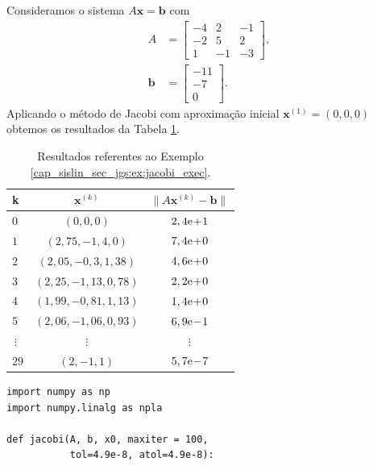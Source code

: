 \begin{ex}\label{cap_sislin_sec_jgs:ex:jacobi_exec}
  Consideramos o sistema $A\pmb{x} = \pmb{b}$ com
  \begin{equation}
    \begin{aligned}
    A &=
    \begin{bmatrix}
      -4 & 2 & -1 \\
      -2 & 5 & 2 \\
       1 & -1 & -3
    \end{bmatrix},\\
    \pmb{b} &=
    \begin{bmatrix}
      -11\\ -7\\ 0
    \end{bmatrix}.
  \end{aligned}
  \end{equation}
  Aplicando o método de Jacobi com aproximação inicial $\pmb{x}^{(1)} = (0, 0, 0)$ obtemos os resultados da Tabela \ref{cap_sislin_sec_jgs:tab:ex_jacobi_exec}.

  \begin{table}[h!]
    \centering
    \begin{tabular}{l|cc}
      k & $\pmb{x}^{(k)}$ & $\|A\pmb{x}^{(k)}-\pmb{b}\|$\\\hline
      $0$ & $(0, 0, 0)$ & $2,4\mathrm{e}\!+\!1$ \\
      $1$ & $(2,75, -1,4, 0)$ & $7,4\mathrm{e}\!+\!0$ \\
      $2$ & $(2,05, -0,3,  1,38)$ & $4,6\mathrm{e}\!+\!0$ \\
      $3$ & $(2,25, -1,13, 0,78)$ & $2,2\mathrm{e}\!+\!0$ \\
      $4$ & $(1,99, -0,81, 1,13)$ & $1,4\mathrm{e}\!+\!0$ \\
      $5$ & $(2,06, -1,06,  0,93)$ & $6,9\mathrm{e}\!-\!1$ \\
      $~\vdots$ & $\vdots$ & $\vdots$\\
      $29$ & $(2, -1,  1)$ & $5,7\mathrm{e}\!-\!7$\\\hline
    \end{tabular}
    \caption{Resultados referentes ao Exemplo \ref{cap_sislin_sec_jgs:ex:jacobi_exec}.}
    \label{cap_sislin_sec_jgs:tab:ex_jacobi_exec}
  \end{table}

\begin{lstlisting}[caption=jacobi.py, label=cap_sislin_sec_jgs:cod:jacobi]
import numpy as np
import numpy.linalg as npla

def jacobi(A, b, x0, maxiter = 100,
           tol=4.9e-8, atol=4.9e-8):
    

\end{lstlisting}
\end{ex}
